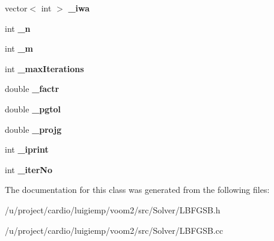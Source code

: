 \begin{DoxyCompactItemize}
\item 
\hypertarget{classvoom_1_1_l_b_f_g_s_b_a502327043d8548b71a77691f2c9e752c}{
vector$<$ int $>$ {\bfseries \_\-iwa}}
\label{classvoom_1_1_l_b_f_g_s_b_a502327043d8548b71a77691f2c9e752c}

\item 
\hypertarget{classvoom_1_1_l_b_f_g_s_b_a21deb6a07f5597430339136cf780c88f}{
int {\bfseries \_\-n}}
\label{classvoom_1_1_l_b_f_g_s_b_a21deb6a07f5597430339136cf780c88f}

\item 
\hypertarget{classvoom_1_1_l_b_f_g_s_b_a42ecdefb7f7e24648bc742846036ea48}{
int {\bfseries \_\-m}}
\label{classvoom_1_1_l_b_f_g_s_b_a42ecdefb7f7e24648bc742846036ea48}

\item 
\hypertarget{classvoom_1_1_l_b_f_g_s_b_a6748820bc5e27c952c6a0ecab9795c74}{
int {\bfseries \_\-maxIterations}}
\label{classvoom_1_1_l_b_f_g_s_b_a6748820bc5e27c952c6a0ecab9795c74}

\item 
\hypertarget{classvoom_1_1_l_b_f_g_s_b_a112a42abaa1091e23c65d221e42e9503}{
double {\bfseries \_\-factr}}
\label{classvoom_1_1_l_b_f_g_s_b_a112a42abaa1091e23c65d221e42e9503}

\item 
\hypertarget{classvoom_1_1_l_b_f_g_s_b_a13d2aec66d42a8ad933290d9a574ade8}{
double {\bfseries \_\-pgtol}}
\label{classvoom_1_1_l_b_f_g_s_b_a13d2aec66d42a8ad933290d9a574ade8}

\item 
\hypertarget{classvoom_1_1_l_b_f_g_s_b_a9e4bf52e5affa003434589d696644e5d}{
double {\bfseries \_\-projg}}
\label{classvoom_1_1_l_b_f_g_s_b_a9e4bf52e5affa003434589d696644e5d}

\item 
\hypertarget{classvoom_1_1_l_b_f_g_s_b_a2d7eb532eea25e7675e2866c27f30c8b}{
int {\bfseries \_\-iprint}}
\label{classvoom_1_1_l_b_f_g_s_b_a2d7eb532eea25e7675e2866c27f30c8b}

\item 
\hypertarget{classvoom_1_1_l_b_f_g_s_b_a7babc694ce25cd8fea76f223ef2b4914}{
int {\bfseries \_\-iterNo}}
\label{classvoom_1_1_l_b_f_g_s_b_a7babc694ce25cd8fea76f223ef2b4914}

\end{DoxyCompactItemize}


The documentation for this class was generated from the following files:\begin{DoxyCompactItemize}
\item 
/u/project/cardio/luigiemp/voom2/src/Solver/LBFGSB.h\item 
/u/project/cardio/luigiemp/voom2/src/Solver/LBFGSB.cc\end{DoxyCompactItemize}
